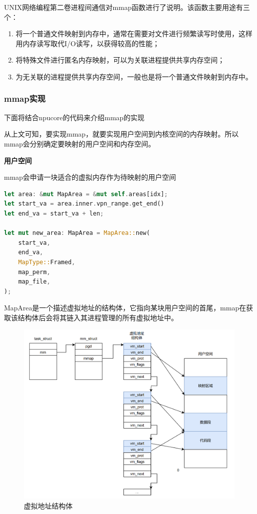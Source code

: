 UNIX网络编程第二卷进程间通信对mmap函数进行了说明。该函数主要用途有三个：
\begin{enumerate}
    \item 将一个普通文件映射到内存中，通常在需要对文件进行频繁读写时使用，这样用内存读写取代I/O读写，以获得较高的性能；
    \item 将特殊文件进行匿名内存映射，可以为关联进程提供共享内存空间；
    \item 为无关联的进程提供共享内存空间，一般也是将一个普通文件映射到内存中。
\end{enumerate}

\subsubsection{mmap实现}
下面将结合npucore的代码来介绍mmap的实现

从上文可知，要实现mmap，就要实现用户空间到内核空间的内存映射。所以mmap会分别确定要映射的用户空间和内存空间。

\textbf{用户空间}

mmap会申请一块适合的虚拟内存作为待映射的用户空间
\begin{lstlisting}[language={Rust}, label={code:new_area},
	caption={os/src/mm/memory_set.rs}]
let area: &mut MapArea = &mut self.areas[idx];
let start_va = area.inner.vpn_range.get_end()
let end_va = start_va + len;

let mut new_area: MapArea = MapArea::new(
    start_va,
    end_va,
    MapType::Framed,
    map_perm,
    map_file,
);
\end{lstlisting}
MapArea是一个描述虚拟地址的结构体，它指向某块用户空间的首尾，mmap在获取该结构体后会将其链入其进程管理的所有虚拟地址中。

\begin{figure}[H]
    \centering
    \caption[short]{虚拟地址结构体}
    \includegraphics[width=0.8\linewidth]{figures/09-04-mmap-虚拟地址结构体.png}
\end{figure}

